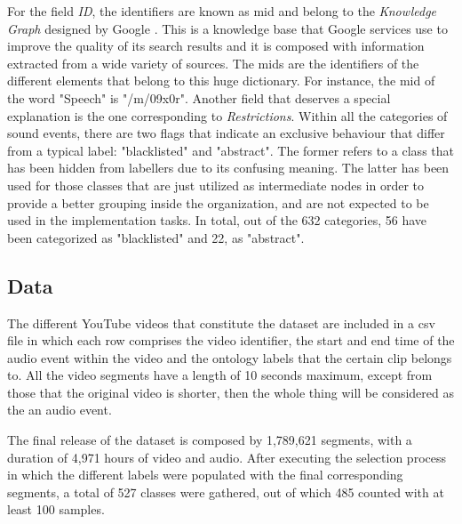 	
	
	For the field \textit{ID}, the identifiers are known as \acrfull{mid} and belong to the \textit{Knowledge Graph} designed by Google \cite{Singhal2012}. This is a knowledge base that Google services use to improve the quality of its search results and it is composed with information extracted from a wide variety of sources. The \acrshort{mid}s are the identifiers of the different elements that belong to this huge dictionary. For instance, the \acrshort{mid} of the word "Speech" is "/m/09x0r". Another field that deserves a special explanation is the one corresponding to \textit{Restrictions}. Within all the categories of sound events, there are two flags that indicate an exclusive behaviour that differ from a typical label: "blacklisted" and "abstract". The former refers to a class that has been hidden from labellers due to its confusing meaning. The latter has been used for those classes that are just utilized as intermediate nodes in order to provide a better grouping inside the organization, and are not expected to be used in the implementation tasks. In total, out of the 632 categories, 56 have been categorized as "blacklisted" and 22, as "abstract".
	
\subsection{Data}
\label{subsection:data}

	The different YouTube videos that constitute the dataset are included in a \acrshort{csv} file in which each row comprises the video identifier, the start and end time of the audio event within the video and the ontology labels that the certain clip belongs to. All the video segments have a length of 10 seconds maximum, except from those that the original video is shorter, then the whole thing will be considered as the an audio event. 
	
	The final release of the dataset is composed by 1,789,621 segments, with a duration of 4,971 hours of video and audio. After executing the selection process in which the different labels were populated with the final corresponding segments, a total of 527 classes were gathered, out of which 485 counted with at least 100 samples.
	

